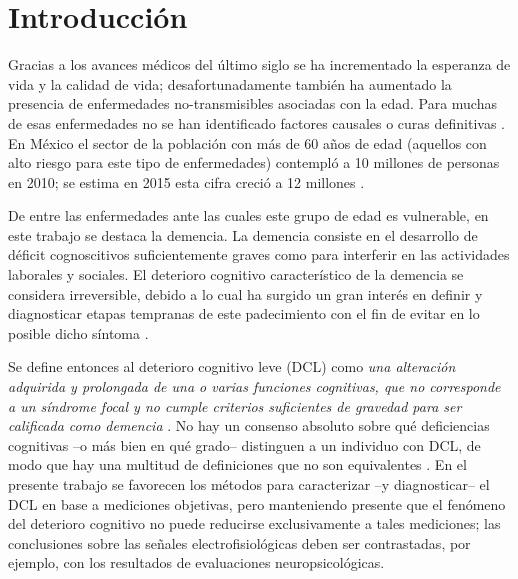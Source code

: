 
\chapter{Introducción}

Gracias a los avances médicos del último siglo se ha incrementado la esperanza de vida y la 
calidad de vida; desafortunadamente también ha aumentado la presencia de enfermedades 
no-transmisibles asociadas con la edad. 
%
Para muchas de esas enfermedades no se han identificado factores causales o curas definitivas 
\cite{PlanAlzheimer04}.
%
En México el sector de la población con más de 60 años de edad (aquellos con alto riesgo para este
tipo de enfermedades) contempló a 10 millones de personas en 2010; se estima en 2015 esta cifra 
creció a 12 millones \cite{Censo10,Intercensal15}.

De entre las enfermedades ante las cuales este grupo de edad es vulnerable, en este trabajo se 
destaca la demencia. 
%
La demencia consiste en el desarrollo de déficit cognoscitivos suficientemente graves como para 
interferir en las actividades laborales y sociales.
%
El deterioro cognitivo característico de la demencia se considera irreversible, debido a lo cual 
ha surgido un gran interés en definir y diagnosticar etapas tempranas de este padecimiento con el 
fin de evitar en lo posible dicho síntoma \cite{Knopman01}.

Se define entonces al deterioro cognitivo leve (DCL) como \textit{una alteración adquirida y 
prolongada de una o varias funciones cognitivas, que no corresponde a un síndrome focal y no cumple 
criterios suficientes de gravedad para ser calificada como demencia} \cite{Robles02}.
%
No hay un consenso absoluto sobre qué deficiencias cognitivas --o más bien en qué grado-- 
distinguen a un individuo con DCL, de modo que hay una multitud de definiciones que no son
equivalentes \cite{Petersen01}.
%
En el presente trabajo se favorecen los métodos para caracterizar --y diagnosticar-- el DCL en base 
a mediciones objetivas, pero manteniendo presente que el fenómeno del deterioro cognitivo no puede 
reducirse exclusivamente a tales mediciones; las conclusiones sobre las señales electrofisiológicas 
deben ser contrastadas, por ejemplo, con los resultados de evaluaciones neuropsicológicas.

